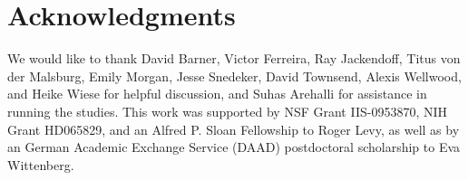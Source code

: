 \clearpage
\section*{Acknowledgments}
We would like to thank David Barner, Victor Ferreira, Ray Jackendoff, Titus von der Malsburg, Emily Morgan, Jesse Snedeker, David Townsend, Alexis Wellwood, and Heike Wiese for helpful discussion, and Suhas Arehalli for assistance in running the studies. This work was supported by NSF Grant IIS-0953870, NIH Grant HD065829, and an Alfred P. Sloan Fellowship to Roger Levy, as well as by an German Academic Exchange Service (DAAD) postdoctoral scholarship to Eva Wittenberg.